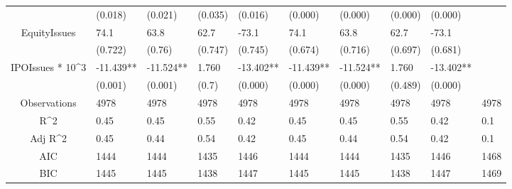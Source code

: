 \documentclass{article}
\begin{document}
\begin{table}[H]
\begin{tabular}{|clllllllll|}
   & (0.018) & (0.021) & (0.035) & (0.016) & (0.000) & (0.000) & (0.000) & (0.000) &  \\ 
  EquityIssues & 74.1 & 63.8 & 62.7 & -73.1 & 74.1 & 63.8 & 62.7 & -73.1 &  \\ 
   & (0.722) & (0.76) & (0.747) & (0.745) & (0.674) & (0.716) & (0.697) & (0.681) &  \\ 
  IPOIssues * 10^3 & -11.439** & -11.524** & 1.760 & -13.402** & -11.439** & -11.524** & 1.760 & -13.402** &  \\ 
   & (0.001) & (0.001) & (0.7) & (0.000) & (0.000) & (0.000) & (0.489) & (0.000) &  \\ 
  \hline 
 Observations & 4978 & 4978 & 4978 & 4978 & 4978 & 4978 & 4978 & 4978 & 4978 \\ 
  R^2 & 0.45 & 0.45 & 0.55 & 0.42 & 0.45 & 0.45 & 0.55 & 0.42 & 0.1 \\ 
  Adj R^2 & 0.45 & 0.44 & 0.54 & 0.42 & 0.45 & 0.44 & 0.54 & 0.42 & 0.1 \\ 
  AIC & 1444 & 1444 & 1435 & 1446 & 1444 & 1444 & 1435 & 1446 & 1468 \\ 
  BIC & 1445 & 1445 & 1438 & 1447 & 1445 & 1445 & 1438 & 1447 & 1469 \\ 
   \hline
\end{tabular}
 
\end{table}
\end{document}
